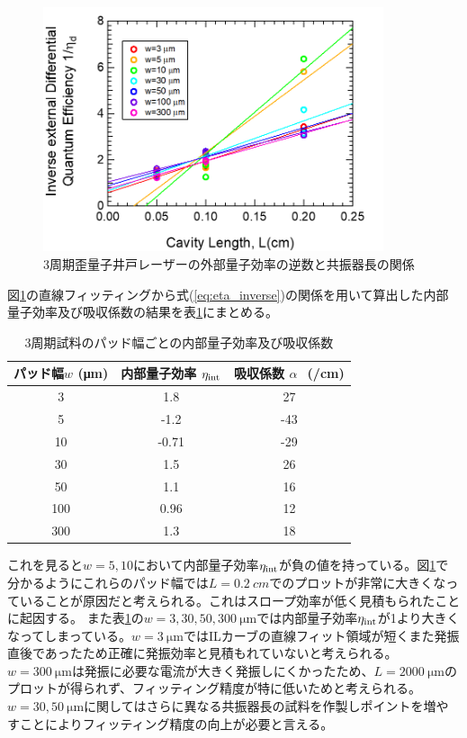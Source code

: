 {{\begin{figure}[h]
	\centering
	\includegraphics[width=10cm]{figure/fig_3_1_3QW_broadcontact_id_inverse_02.png}
	\caption{3周期歪量子井戸レーザーの外部量子効率の逆数と共振器長の関係}
	\label{fig:fig_3_1_3QW_broadcontact_id_inverse_02}
\end{figure}
図\ref{fig:fig_3_1_3QW_broadcontact_id_inverse_02}の直線フィッティングから式(\ref{eq:eta_inverse})の関係を用いて算出した内部量子効率及び吸収係数の結果を表\ref{table:table_3QW_i_int}にまとめる。
\begin{table}[h]
  \caption{3周期試料のパッド幅ごとの内部量子効率及び吸収係数}
  \label{table:table_3QW_i_int}
  \centering
  \begin{tabular}{ccc}
    \hline
    パッド幅$w$ (\si{\micro\metre})  &  内部量子効率 $\eta_{\rm{int}} $ &吸収係数 $\alpha\ $\ (/\si{cm}) \\
    \hline \hline
     3 & 1.8 & 27 \\
    5  & -1.2 & -43\\
    10  & -0.71 & -29\\ 
    30& 1.5& 26\\
    50& 1.1&16 \\
    100& 0.96& 12\\
    300&1.3 & 18\\
    \hline
  \end{tabular}
\end{table}


これを見ると$w=5, 10$において内部量子効率$\eta_{\rm{int}}$が負の値を持っている。図\ref{fig:fig_3_1_3QW_broadcontact_id_inverse_02}で分かるようにこれらのパッド幅では$L=0.2\ \si{cm}$でのプロットが非常に大きくなっていることが原因だと考えられる。これはスロープ効率が低く見積もられたことに起因する。
また表\ref{table:table_3QW_i_int}の$w=3, 30, 50, 300\ \si{\micro\metre}$では内部量子効率$\eta_{\rm{int}}$が1より大きくなってしまっている。$w=3\ \si{\micro\metre}$ではILカーブの直線フィット領域が短くまた発振直後であったため正確に発振効率と見積もれていないと考えられる。$w=300\ \si{\micro\metre}$は発振に必要な電流が大きく発振しにくかったため、$L=2000\ \si{\micro\metre}$のプロットが得られず、フィッティング精度が特に低いためと考えられる。$w=30, 50\ \si{\micro\metre}$に関してはさらに異なる共振器長の試料を作製しポイントを増やすことによりフィッティング精度の向上が必要と言える。

}}
